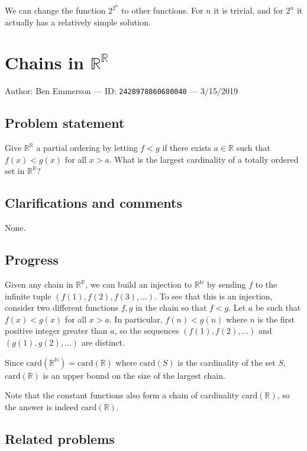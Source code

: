 \documentclass[10pt]{article}
\begin{document}
We can change the function $2^{2^n}$ to other functions. For $n$ it is trivial, and for $2^n$ it actually has a relatively simple solution.

\pagebreak

\section{Chains in $\mathbb{R}^\mathbb{R}$}

Author: Ben Emmerson --- ID: \verb`2428978860680040` --- 3/15/2019

\subsection{Problem statement}

Give $\mathbb{R}^\mathbb{R}$ a partial ordering by letting $f<g$ if there exists $a\in\mathbb{R}$ such that $f(x)<g(x)$ for all $x>a$. What is the largest cardinality of a totally ordered set in $\mathbb{R}^\mathbb{R}$?

\subsection{Clarifications and comments}

None.

\subsection{Progress}

Given any chain in $\mathbb{R}^\mathbb{R}$, we can build an injection to $\mathbb{R}^\mathbb{N}$ by sending $f$ to the infinite tuple $(f(1),f(2),f(3),\ldots)$. To see that this is an injection, consider two different functions $f,g$ in the chain so that $f<g$. Let $a$ be such that $f(x)<g(x)$ for all $x>a$. In particular, $f(n)<g(n)$ where $n$ is the first positive integer greater than $a$, so the sequences $(f(1),f(2),\ldots)$ and $(g(1),g(2),\ldots)$ are distinct.

Since $\textrm{card}(\mathbb{R}^\mathbb{N})=\textrm{card}(\mathbb{R})$ where $\textrm{card}(S)$ is the cardinality of the set $S$, $\textrm{card}(\mathbb{R})$ is an upper bound on the size of the largest chain.

 Note that the constant functions also form a chain of cardinality $\textrm{card}(\mathbb{R})$, so the answer is indeed $\textrm{card}(\mathbb{R})$.

\subsection{Related problems}
\end{document}
